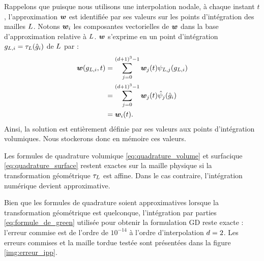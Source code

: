 Rappelons que puisque nous utilisons une interpolation nodale, à chaque instant $t$,
l’approximation $\bm{w}$ est identifiée par ses valeurs sur les points d’intégration
des mailles $L$. Notons $\bm{w}_i$ les composantes vectorielles de $\bm{w}$ dans
la base d’approximation relative à $L$. $\bm{w}$ s’exprime en un point d’intégration
$g_{L,i} = \tau_{L}(\hat{g}_{i})$ de $L$ par :
\begin{equation}
	\begin{aligned}
		\bm{w}(g_{L,i},t) &= \sum_{j=0}^{(d + 1)^3 - 1}
			\bm{w}_j(t) \psi_{L,j}(g_{L,i}) \\
		&= \sum_{j=0}^{(d + 1)^3 - 1} \bm{w}_j(t) \hat{\psi}_{j}(\hat{g}_{i}) \\
		&= \bm{w}_i(t) .
	\end{aligned}
\end{equation}
Ainsi, la solution est entièrement définie par ses valeurs aux points d’intégration
volumiques. Nous stockerons donc en mémoire ces valeurs.

\begin{remark}
	Les formules de quadrature volumique \eqref{eq:quadrature_volume}
	et surfacique \eqref{eq:quadrature_surface} restent exactes sur la maille physique si
	la transformation géométrique $\tau_{L}$ est affine.
	Dans le cas contraire,
	l'intégration numérique devient approximative.
\end{remark}
	
\begin{remark}
	Bien que les formules de quadrature soient approximatives
	lorsque la transformation géométrique est quelconque,
	l'intégration par parties \eqref{eq:formule_de_green} utilisée
	pour obtenir la formulation GD reste exacte : l'erreur commise
	est de l'ordre de $10^{-14}$ à l'ordre d'interpolation $d = 2$.
	Les erreurs commises et la maille tordue testée sont présentées
	dans la figure \ref{img:erreur_ipp}.
\end{remark}


